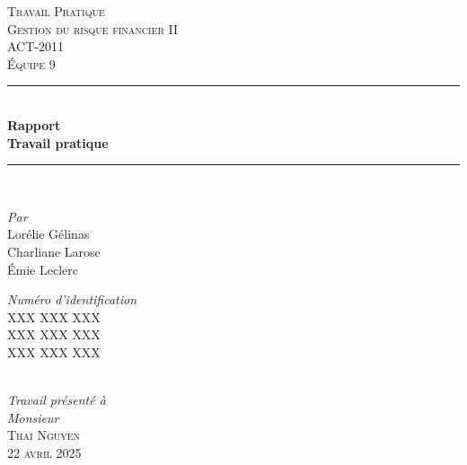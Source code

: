 \begin{titlepage}

\newcommand{\HRule}{\rule{\linewidth}{0.5mm}} %

\center %
\textsc{\LARGE Travail Pratique}\\[1.0cm]
\textsc{\Large Gestion du risque financier II}\\[0.2cm]
\textsc{\large ACT-2011}\\[0.7cm]
\textsc{\large Équipe 9}\\[0.7cm]

\HRule \\[0.4cm]
{ \Large \bfseries Rapport}\\[0.20cm] { \huge \bfseries Travail pratique}\\[0.20cm]

\HRule \\[2cm]

\begin{minipage}{0.4\textwidth}
    \begin{flushleft} \large
    \emph{Par}\\
        Lorélie Gélinas \textsc{}\\
        Charliane Larose \textsc{}\\
        Émie Leclerc \textsc{}
    \end{flushleft}
\end{minipage}%
\begin{minipage}{0.4\textwidth}
    \begin{flushright} \large
    \emph{Numéro d'identification}\\
        XXX XXX XXX\\
        XXX XXX XXX\\
        XXX XXX XXX\\
    \end{flushright}
\end{minipage} \\[1.0cm]

\emph{Travail présenté à} \\
\emph{Monsieur} \\[0.1cm]
\textsc{\Large Thai \textsc{Nguyen}}\\[1.0cm]

\textsc{\large 22 avril 2025}\\[1cm]
 
\vfill %

\end{titlepage}